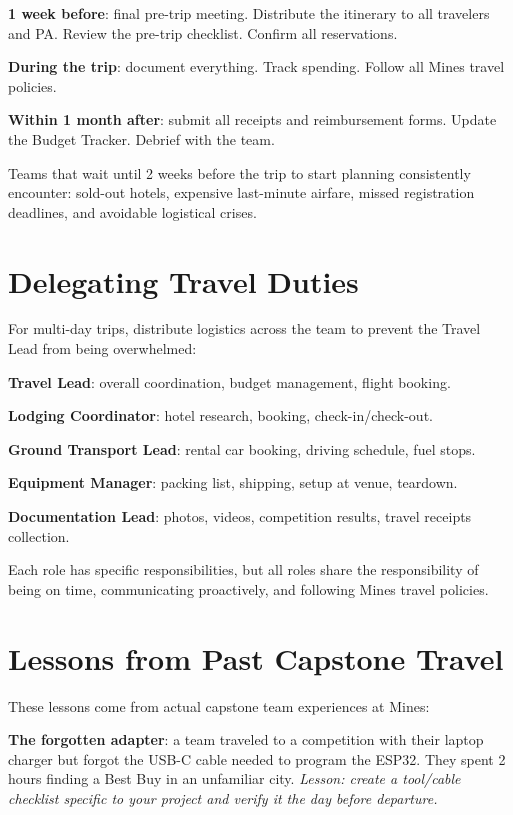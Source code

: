 \textbf{1 week before}: final pre-trip meeting. Distribute the itinerary to all travelers and PA. Review the pre-trip checklist. Confirm all reservations.

\textbf{During the trip}: document everything. Track spending. Follow all Mines travel policies.

\textbf{Within 1 month after}: submit all receipts and reimbursement forms. Update the Budget Tracker. Debrief with the team.

Teams that wait until 2 weeks before the trip to start planning consistently encounter: sold-out hotels, expensive last-minute airfare, missed registration deadlines, and avoidable logistical crises.

\section{Delegating Travel Duties}
For multi-day trips, distribute logistics across the team to prevent the Travel Lead from being overwhelmed:

\textbf{Travel Lead}: overall coordination, budget management, flight booking.

\textbf{Lodging Coordinator}: hotel research, booking, check-in/check-out.

\textbf{Ground Transport Lead}: rental car booking, driving schedule, fuel stops.

\textbf{Equipment Manager}: packing list, shipping, setup at venue, teardown.

\textbf{Documentation Lead}: photos, videos, competition results, travel receipts collection.

Each role has specific responsibilities, but all roles share the responsibility of being on time, communicating proactively, and following Mines travel policies.



\section{Lessons from Past Capstone Travel}
These lessons come from actual capstone team experiences at Mines:

\textbf{The forgotten adapter}: a team traveled to a competition with their laptop charger but forgot the USB-C cable needed to program the ESP32. They spent 2 hours finding a Best Buy in an unfamiliar city. \emph{Lesson: create a tool/cable checklist specific to your project and verify it the day before departure.}

